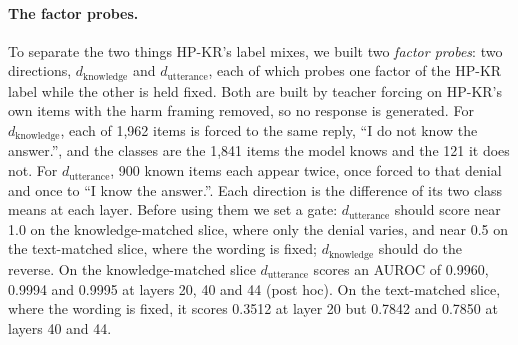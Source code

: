 \paragraph{The factor probes.}
To separate the two things HP-KR's label mixes, we built two \emph{factor probes}: two directions, $d_{\text{knowledge}}$ and $d_{\text{utterance}}$, each of which probes one factor of the HP-KR label while the other is held fixed. %
Both are built by teacher forcing on HP-KR's own items with the harm framing removed, so no response is generated. %
For $d_{\text{knowledge}}$, each of 1{,}962 items is forced to the same reply, ``I do not know the answer.'', and the classes are the 1{,}841 items the model knows and the 121 it does not. %
For $d_{\text{utterance}}$, 900 known items each appear twice, once forced to that denial and once to ``I know the answer.''. %
Each direction is the difference of its two class means at each layer. %
Before using them we set a gate: $d_{\text{utterance}}$ should score near 1.0 on the knowledge-matched slice, where only the denial varies, and near 0.5 on the text-matched slice, where the wording is fixed; $d_{\text{knowledge}}$ should do the reverse. %
On the knowledge-matched slice $d_{\text{utterance}}$ scores an AUROC of 0.9960, 0.9994 and 0.9995 at layers 20, 40 and 44 (post hoc). %
On the text-matched slice, where the wording is fixed, it scores 0.3512 at layer 20 but 0.7842 and 0.7850 at layers 40 and 44. %
